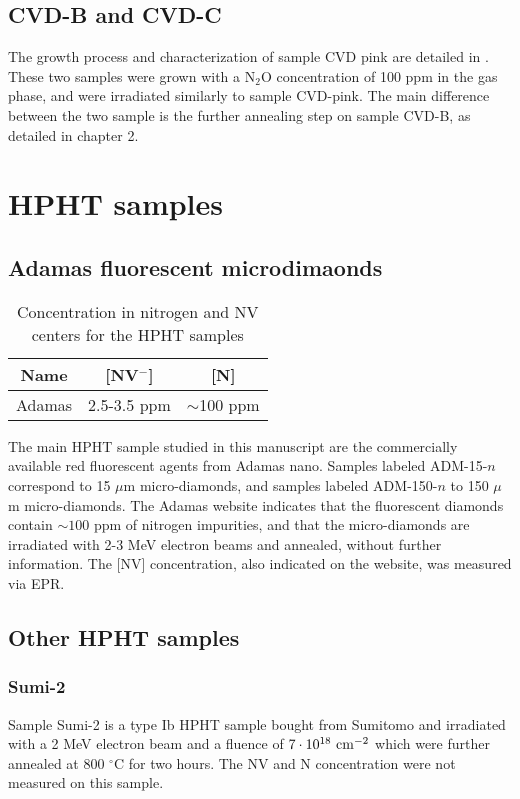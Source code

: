 \documentclass[a4paper, 11pt]{book}
\begin{document}
\subsection{CVD-B and CVD-C}
The growth process and characterization of sample CVD pink are detailed in \citep{ngambou2022improving}. These two samples were grown with a N$_2$O concentration of 100 ppm in the gas phase, and were irradiated similarly to sample CVD-pink. The main difference between the two sample is the further annealing step on sample CVD-B, as detailed in chapter 2.

\section{HPHT samples}
\subsection{Adamas fluorescent microdimaonds}
\begin{table}[htbp]
\centering
\caption{Concentration in nitrogen and NV centers for the HPHT samples}
\label{Table samples adamas}
\begin{tabular}{c|cc}
\toprule
Name &  [NV$^-$] & [N] \\
\midrule
Adamas & 2.5-3.5 ppm & $\sim$100 ppm \\

\bottomrule
\end{tabular}
\end{table}

The main HPHT sample studied in this manuscript are the commercially available red fluorescent agents from Adamas nano. Samples labeled ADM-15-$n$ correspond to 15 $\mu$m micro-diamonds, and samples labeled ADM-150-$n$ to 150 $\mu$m micro-diamonds. The Adamas website indicates that the fluorescent diamonds contain $\sim 100$ ppm of nitrogen impurities, and that the micro-diamonds are irradiated with 2-3 MeV electron beams and annealed, without further information. The [NV] concentration, also indicated on the website, was measured via EPR.

\subsection{Other HPHT samples}
\subsubsection{Sumi-2}
Sample Sumi-2 is a type Ib HPHT sample bought from Sumitomo and irradiated with a 2 MeV electron beam and a fluence of $7\cdot 10^{18}\ \rm cm^{-2}$ which were further annealed at 800 $^\circ$C for two hours. The NV and N concentration were not measured on this sample.
\end{document}
